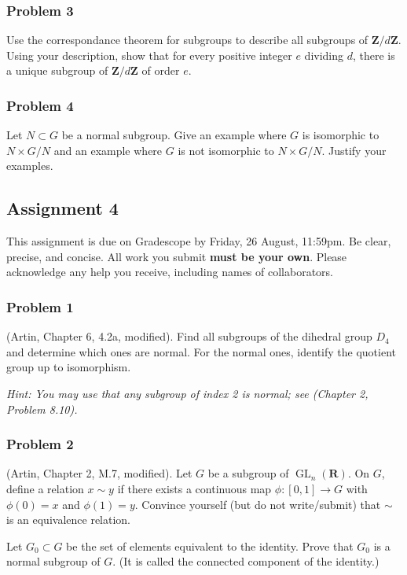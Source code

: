 \documentclass[11pt]{article}
\begin{document}
\subsubsection*{Problem 3}
\label{sec:orgaac3be4}
Use the correspondance theorem for subgroups to describe all subgroups of \(\mathbf{Z}/d \mathbf{Z}\).
Using your description, show that for every positive integer \(e\) dividing \(d\), there is a unique subgroup of \(\mathbf{Z}/d \mathbf{Z}\) of order \(e\).

\subsubsection*{Problem 4}
\label{sec:org1c2cb58}
Let \(N \subset G\) be a normal subgroup.
Give an example where \(G\) is isomorphic to \(N \times G/N\) and an example where \(G\) is not isomorphic to \(N \times G/N\). 
   Justify your examples.
\subsection*{Assignment 4}
\label{sec:org0ec7716}
This assignment is due on Gradescope by Friday, 26 August, 11:59pm.
Be clear, precise, and concise.  All work you submit \textbf{must be your own}.  Please acknowledge any help you receive, including names of collaborators.

\subsubsection*{Problem 1}
\label{sec:org4420a2e}
(Artin, Chapter 6, 4.2a, modified).
Find all subgroups of the dihedral group \(D_4\) and determine which ones are normal.
For the normal ones, identify the quotient group up to isomorphism.

\emph{Hint: You may use that any subgroup of index 2 is normal; see (Chapter 2, Problem 8.10).}


\subsubsection*{Problem 2}
\label{sec:org9578c75}
(Artin, Chapter 2, M.7, modified).
Let \(G\) be a subgroup of \(\operatorname{GL}_n(\mathbf{R})\).
On \(G\), define a relation \(x \sim y\) if there exists a continuous map \(\phi \colon [0,1] \to G\) with \(\phi(0) = x\) and \(\phi(1) = y\).
Convince yourself (but do not write/submit) that \(\sim\) is an equivalence relation.

Let \(G_0 \subset G\) be the set of elements equivalent to the identity.
Prove that \(G_0\) is a normal subgroup of \(G\).
(It is called the connected component of the identity.)
\end{document}
